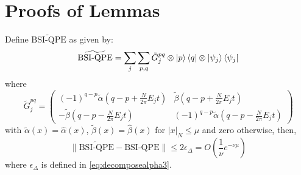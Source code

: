 \section{Proofs of Lemmas}
\label{section:appendixTrunc}
\begin{lemma*}[\ref{lemma:0}]
    Define $\widetilde{\text{BSI-QPE}}$ as given by:
    \begin{equation}
       \widetilde{\text{BSI-QPE}}=\sum_j \sum_{p,q} \tilde G^{pq}_j \otimes \ket{p}\bra{q} \otimes \ket{\psi_j}\bra{\psi_j}
    \end{equation}
    where 
    \begin{equation}
        \tilde G^{pq}_j = \begin{pmatrix}
        (-1)^{q-p}\tilde\alpha(q-p+\frac{N}{2\pi}E_jt) & \tilde\beta(q-p+\frac{N}{2\pi}E_jt)\\
        -\tilde\beta (q-p-\frac{N}{2\pi}E_jt) & (-1)^{q-p}\tilde\alpha(q-p-\frac{N}{2\pi}E_jt)
    \end{pmatrix}
    \end{equation}
    with $\tilde\alpha(x)=\hat\alpha(x)$, $\tilde\beta(x)=\hat\beta(x)$ for $|x|_{N}\leq\mu$ and zero otherwise, then,  
    \begin{equation}
        \|\widetilde{\text{BSI-QPE}}-\text{BSI-QPE}\| \leq 2\epsilon_{\Delta}= O\left(\frac{1}{\nu}e^{-\nu \mu}\right)
    \end{equation}
    where $\epsilon_{\Delta}$ is defined in \eqref{eq:decomposealpha3}.
\end{lemma*}
